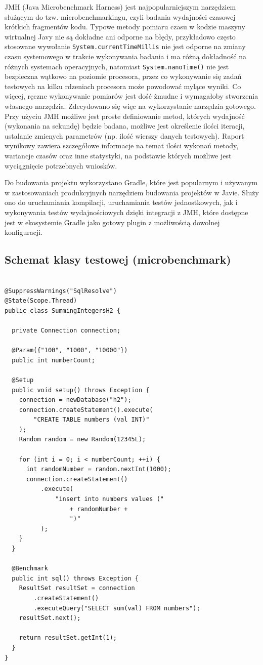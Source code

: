\documentclass[12pt]{extarticle}
\begin{document}
    JMH (Java Microbenchmark Harness) jest najpopularniejszym narzędziem służącym do tzw. microbenchmarkingu, czyli badania wydajności czasowej krótkich fragmentów kodu. Typowe metody pomiaru czasu w kodzie maszyny wirtualnej Javy nie są dokładne ani odporne na błędy, przykładowo często stosowane wywołanie \texttt{System.currentTimeMillis} nie jest odporne na zmiany czasu systemowego w trakcie wykonywania badania i ma różną dokładność na różnych systemach operacyjnych, natomiast \texttt{System.nanoTime()} nie jest bezpieczna wątkowo na poziomie procesora, przez co wykonywanie się zadań testowych na kilku rdzeniach procesora może powodować mylące wyniki. Co więcej, ręczne wykonywanie pomiarów jest dość żmudne i wymagałoby stworzenia własnego narzędzia. Zdecydowano się więc na wykorzystanie narzędzia gotowego. Przy użyciu JMH możliwe jest proste definiowanie metod, których wydajność (wykonania na sekundę) będzie badana, możliwe jest określenie ilości iteracji, ustalanie zmienych parametrów (np. ilość wierszy danych testowych). Raport wynikowy zawiera szczegółowe informacje na temat ilości wykonań metody, wariancje czasów oraz inne statystyki, na podstawie których możliwe jest wyciągnięcie potrzebnych wniosków.

    Do budowania projektu wykorzystano Gradle, które jest popularnym i używanym w zastosowaniach produkcyjnych narzędziem budowania projektów w Javie. Służy ono do uruchamiania kompilacji, uruchamiania testów jednostkowych, jak i wykonywania testów wydajnościowych dzięki integracji z JMH, które dostępne jest w ekosystemie Gradle jako gotowy plugin z możliwością dowolnej konfiguracji.

\subsection{Schemat klasy testowej (microbenchmark)}

\begin{lstlisting}[label=testclass, caption=Przykładowa klasa JMH]

@SuppressWarnings("SqlResolve")
@State(Scope.Thread)
public class SummingIntegersH2 {
  
  private Connection connection;
  
  @Param({"100", "1000", "10000"})
  public int numberCount;
  
  @Setup
  public void setup() throws Exception {
    connection = newDatabase("h2");
    connection.createStatement().execute(
        "CREATE TABLE numbers (val INT)"
    );
    Random random = new Random(12345L);
    
    for (int i = 0; i < numberCount; ++i) {
      int randomNumber = random.nextInt(1000);
      connection.createStatement()
          .execute(
              "insert into numbers values ("
                  + randomNumber +
                  ")"
          );
    }
  }
  
  @Benchmark
  public int sql() throws Exception {
    ResultSet resultSet = connection
        .createStatement()
        .executeQuery("SELECT sum(val) FROM numbers");
    resultSet.next();
    
    return resultSet.getInt(1);
  }
}


\end{lstlisting}
\end{document}
